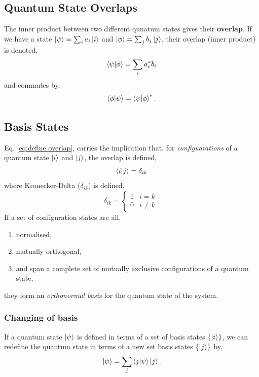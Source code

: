 \documentclass{book}
\begin{document}
\subsection{Quantum State Overlaps}
The inner product between two different qunatum states gives their \textbf{overlap}. If we have a state $\ket{\psi} = \sum_i a_i\ket{i}$ and $\ket{\phi} = \sum_j b_j\ket{j}$, their overlap (inner product) is denoted,
\begin{equation}
	\braket{\psi}{\phi} = \sum_i a_i^*b_i \label{eq:define overlap}
\end{equation}
and commutes by,
\begin{equation}
	\braket{\phi}{\psi} = \braket{\psi}{\phi}^*.
\end{equation}
\subsection{Basis States}
Eq. \eqref{eq:define overlap}, carries the implication that, for \textit{configuarations} of a quantum state $\ket{i}$ and $\ket{j}$, the overlap is defined,
\begin{equation}
	\braket{i}{j} = \delta_{ik}
\end{equation}
where Kronecker-Delta ($\delta_{ik}$) is defined,
\begin{equation}
	\delta_{ik} = \begin{cases}
	1 & i = k\\
	0 & i \neq k
	\end{cases}.
\end{equation}
If a set of configuration states are all,
\begin{enumerate}
	\item normalised,
	\item mutually orthogonal,
	\item and span a complete set of mutually exclusive configurations of a quantum state,
\end{enumerate}
they form an \textit{orthonormal basis} for the quantum state of the system.
\subsubsection{Changing of basis}
If a quantum state $\ket{\psi}$ is defined in terms of a set of basis states $\left\{\ket{i}\right\}$, we can redefine the quantum state in terms of a new set basis states $\left\{\ket{j}\right\}$ by,
\begin{equation}
	\ket{\psi} = \sum_j \braket{j}{\psi}\ket{j}.
\end{equation}
\end{document}
